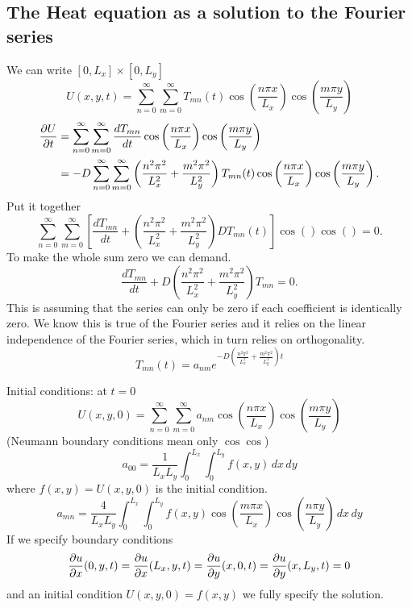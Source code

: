 \documentclass[10pt, a4paper]{article}
\begin{document}
\subsection{The Heat equation as a solution to the Fourier series}
We can write
$[0, L_x] \times [0, L_y]$
\[
U(x, y, t) = \sum_{n = 0}^{\infty}\sum_{m = 0}^{\infty}T_{mn}(t)\cos\left(\frac{n\pi x}{L_x}\right)\cos\left(\frac{m\pi y}{L_y}\right)
\]
\begin{align*}
    \pd[U]{t} &= \sum_{n = 0}^{\infty}\sum_{m = 0}^{\infty}\frac{dT_{mn}}{dt}\cos\left(\frac{n\pi x}{L_x}\right)\cos\left(\frac{m\pi y}{L_y}\right) \\
    &= -D\sum_{n = 0}^{\infty}\sum_{m = 0}^{\infty}\left(\frac{n ^ 2\pi ^ 2}{L_x ^ 2} + \frac{m ^ 2\pi ^ 2}{L_y ^ 2}\right)T_{mn}(t)\cos\left(\frac{n\pi x}{L_x}\right)\cos\left(\frac{m\pi y}{L_y}\right).
\end{align*}
Put it together
\[
\sum_{n = 0}^{\infty}\sum_{m = 0}^{\infty}\left[\frac{dT_{mn}}{dt} + \left(\frac{n ^ 2\pi ^ 2}{L_x ^ 2} + \frac{m ^ 2\pi ^ 2}{L_y ^ 2}\right)DT_{mn}(t)\right]\cos()\cos() = 0.
\]
To make the whole sum zero we can demand.
\[
\frac{dT_{mn}}{dt} + D\left(\frac{n ^ 2\pi ^ 2}{L_x ^ 2} + \frac{m ^ 2\pi ^ 2}{L_y ^ 2}\right)T_{mn} = 0.
\]
This is assuming that the series can only be zero if each coefficient is identically zero.
We know this is true of the Fourier series and it relies on the linear independence of the Fourier series,
which in turn relies on orthogonality. 
\[
T_{mn}(t) = a_{nm}e ^ {-D\left(\frac{n ^ 2\pi ^ 2}{L_x ^ 2} + \frac{m ^ 2\pi ^ 2}{L_y ^ 2}\right)t}
\]

Initial conditions:
at $t = 0$
\[
U(x, y, 0) = \sum_{n = 0}^{\infty}\sum_{m = 0}^{\infty}a_{nm}\cos\left(\frac{n\pi x}{L_x}\right)\cos\left(\frac{m\pi y}{L_y}\right)
\]
(Neumann boundary conditions mean only $\cos\cos$)
\[
a_{00} = \frac{1}{L_xL_y}\int_{0}^{L_x}\int_{0}^{L_y}f(x, y)\,dx\,dy
\]
where $f(x, y) = U(x, y, 0)$ is the initial condition.
\[
a_{mn} = \frac{4}{L_xL_y}\int_{0}^{L_x}\int_{0}^{L_y}f(x, y)\cos\left(\frac{m\pi x}{L_x}\right)\cos\left(\frac{n\pi y}{L_y}\right)\,dx\,dy
\]
If we specify boundary conditions
\[
\pd[u]{x}(0, y, t) = \pd[u]{x}(L_x, y, t) = \pd[u]{y}(x, 0, t) = \pd[u]{y}(x, L_y, t) = 0
\]
and an initial condition $U(x, y, 0) = f(x, y)$ we fully specify the solution.
\end{document}
